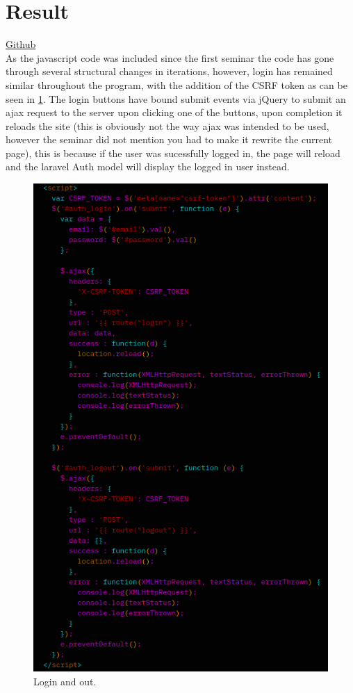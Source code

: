 \documentclass[a4paper]{scrartcl}
\begin{document}
\section{Result}
\href{https://github.com/linus-dev/KTH-Projects/tree/master/ID1354/4/laravel}{Github}
\\
As the javascript code was included since the first seminar the code has gone through
several structural changes in iterations, however, login has remained similar throughout
the program, with the addition of the CSRF token as can be seen in \ref{fig:auth}.
The login buttons have bound submit events via jQuery to submit an ajax request to the server
upon clicking one of the buttons, upon completion it reloads the site (this is obviously not
the way ajax was intended to be used, however the seminar did not mention you had to make
it rewrite the current page), this is because if the user was sucessfully logged in, the
page will reload and the laravel Auth model will display the logged in user instead.
\begin{figure}[H]
  \begin{center}
    \includegraphics[scale=1.0]{images/login_out.png}
    \caption{Login and out.}
    \label{fig:auth}
  \end{center}
\end{figure}
\end{document}
